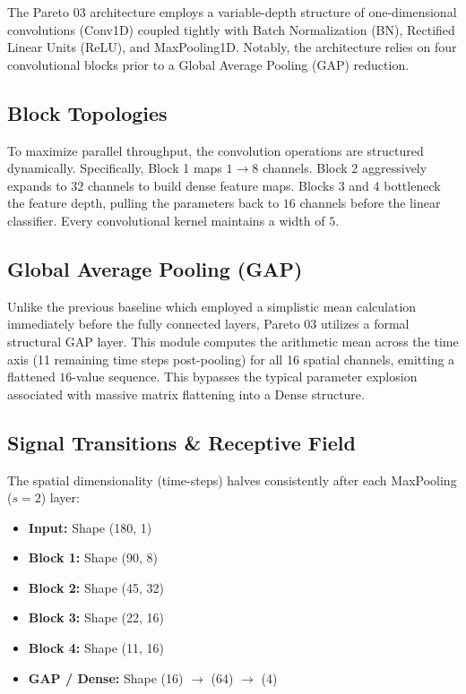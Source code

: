 \documentclass[11pt,a4paper,twocolumn]{article}
\begin{document}
The Pareto 03 architecture employs a variable-depth structure of one-dimensional convolutions (Conv1D) coupled tightly with Batch Normalization (BN), Rectified Linear Units (ReLU), and MaxPooling1D. Notably, the architecture relies on four convolutional blocks prior to a Global Average Pooling (GAP) reduction.

\subsection{Block Topologies}
To maximize parallel throughput, the convolution operations are structured dynamically. Specifically, Block 1 maps $1 \rightarrow 8$ channels. Block 2 aggressively expands to $32$ channels to build dense feature maps. Blocks 3 and 4 bottleneck the feature depth, pulling the parameters back to $16$ channels before the linear classifier. Every convolutional kernel maintains a width of $5$.

\subsection{Global Average Pooling (GAP)}
Unlike the previous baseline which employed a simplistic mean calculation immediately before the fully connected layers, Pareto 03 utilizes a formal structural GAP layer. This module computes the arithmetic mean across the time axis (11 remaining time steps post-pooling) for all 16 spatial channels, emitting a flattened $16$-value sequence. This bypasses the typical parameter explosion associated with massive matrix flattening into a Dense structure.

\subsection{Signal Transitions \& Receptive Field}
The spatial dimensionality (time-steps) halves consistently after each MaxPooling ($s=2$) layer:
\begin{itemize}
    \setlength\itemsep{0em}
    \item \textbf{Input:} Shape (180, 1)
    \item \textbf{Block 1:} Shape (90, 8)
    \item \textbf{Block 2:} Shape (45, 32)
    \item \textbf{Block 3:} Shape (22, 16)
    \item \textbf{Block 4:} Shape (11, 16)
    \item \textbf{GAP / Dense:} Shape (16) $\rightarrow$ (64) $\rightarrow$ (4)
\end{itemize}
\end{document}
